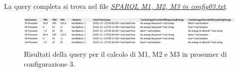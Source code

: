 La query completa si trova nel file \href{https://github.com/19eddie/SemanticWeb-Assignment02-03/blob/main/SPARQL%20M1%2C%20M2%2C%20M3%20in%20config03.txt}{\textit{SPARQL M1, M2, M3 in config03.txt}}.


\begin{figure}[H]
    \centering
    \includegraphics[width=15cm]{images/query_m3_res.png}
    \caption{Risultati della query per il calcolo di M1, M2 e M3 in prosumer di configurazione 3.}
    \label{fig:query_m3_res}
\end{figure}